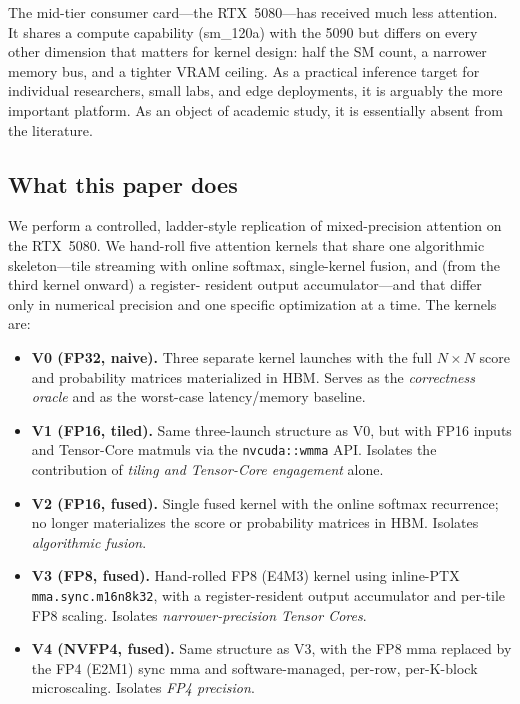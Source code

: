 \documentclass[conference]{IEEEtran}
\begin{document}
The mid-tier consumer card---the RTX~5080---has received much less
attention. It shares a compute capability (sm\_120a) with the 5090 but
differs on every other dimension that matters for kernel design: half
the SM count, a narrower memory bus, and a tighter VRAM ceiling. As a
practical inference target for individual researchers, small labs, and
edge deployments, it is arguably the more important platform. As an
object of academic study, it is essentially absent from the literature.

\subsection*{What this paper does}

We perform a controlled, ladder-style replication of mixed-precision
attention on the RTX~5080. We hand-roll five attention kernels that
share one algorithmic skeleton---tile streaming with online softmax,
single-kernel fusion, and (from the third kernel onward) a register-
resident output accumulator---and that differ only in numerical
precision and one specific optimization at a time. The kernels are:

\begin{itemize}
  \item \textbf{V0 (FP32, naive).} Three separate kernel launches with
        the full $N\times N$ score and probability matrices materialized
        in HBM. Serves as the \emph{correctness oracle} and as the
        worst-case latency/memory baseline.
  \item \textbf{V1 (FP16, tiled).} Same three-launch structure as V0,
        but with FP16 inputs and Tensor-Core matmuls via the
        \texttt{nvcuda::wmma} API. Isolates the contribution of
        \emph{tiling and Tensor-Core engagement} alone.
  \item \textbf{V2 (FP16, fused).} Single fused kernel with the online
        softmax recurrence; no longer materializes the score or
        probability matrices in HBM. Isolates \emph{algorithmic
        fusion}.
  \item \textbf{V3 (FP8, fused).} Hand-rolled FP8 (E4M3) kernel using
        inline-PTX \texttt{mma.sync.m16n8k32}, with a register-resident
        output accumulator and per-tile FP8 scaling. Isolates
        \emph{narrower-precision Tensor Cores}.
  \item \textbf{V4 (NVFP4, fused).} Same structure as V3, with the FP8
        mma replaced by the FP4 (E2M1) sync mma and software-managed,
        per-row, per-K-block microscaling. Isolates \emph{FP4
        precision}.
\end{itemize}
\end{document}
